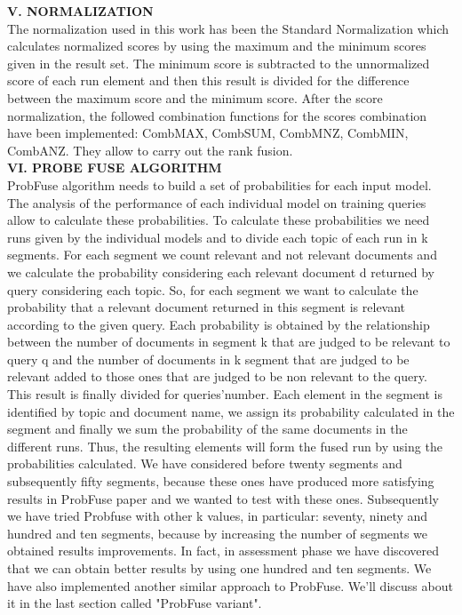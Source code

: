 \documentclass[12pt,journal]{IEEEtran}
\begin{document}
\textbf{V. NORMALIZATION} \\
The normalization used in this work has been the Standard Normalization which calculates normalized scores by using the maximum and the minimum scores given in the result set. 
The minimum score is subtracted to the unnormalized score of each run element and then this result is divided for the difference between the maximum score and the minimum score.
After the score normalization, the followed combination functions for the scores combination have been implemented: CombMAX, CombSUM, CombMNZ, CombMIN, CombANZ.
They allow to carry out the rank fusion. \\

\textbf{VI.	PROBE FUSE ALGORITHM} \\
ProbFuse algorithm needs to build a set of probabilities for each input model. 
The analysis of the performance of each individual model on training queries allow to calculate these probabilities. 
To calculate these probabilities we need runs given by the individual models and to divide each topic of each run in k segments. For each segment we count relevant and not relevant documents and we calculate the probability considering each relevant document d returned by query considering each topic. 
So, for each segment we want to calculate the probability that a relevant document returned in this segment is relevant according to the given query. Each probability is obtained by the relationship between the number of documents in segment k that are judged to be relevant to query q and the number of documents in k segment that are judged to be relevant added to those ones that are judged to be non relevant to the query. This result is finally divided for queries'number.
Each element in the segment is identified by topic and document name, we assign its probability calculated in the segment and finally we sum the probability of the same documents in the different runs.
Thus, the resulting elements will form the fused run by using the probabilities calculated. 
We have considered before twenty segments and subsequently fifty segments, because these ones have produced more satisfying results in ProbFuse paper and we wanted to test with these ones. Subsequently we have tried Probfuse with other k values, in particular: seventy, ninety and hundred and ten segments, because by increasing the number of segments we obtained results improvements. In fact, in assessment phase we have discovered that we can obtain better results by using one hundred and ten segments. We have also implemented another similar approach to ProbFuse. We'll discuss about it in the last section called "ProbFuse variant". \\
\end{document}
